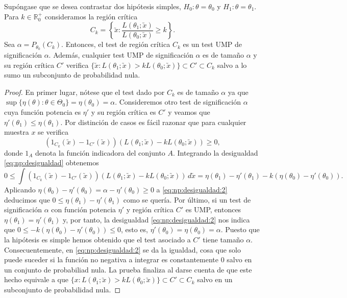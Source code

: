         \begin{thm} \label{thm:np:1}
            Supóngase que se desea contrastar dos hipótesis simples, $H_0 : \theta = \theta_0$ y $H_1 : \theta = \theta_1$. Para $k \in \mathbb{R}^+_0$ consideramos la región crítica
            \[C_k = \left\{\utilde{x}: \frac{L(\theta_1;\utilde{x})}{L(\theta_0;\utilde{x})} \ge k\right\}.\]
            Sea $\alpha = P_{\theta_0}(C_k)$. Entonces, el test de región crítica $C_k$ es un test UMP de significación $\alpha$. Además, cualquier test UMP de significación $\alpha$ es de tamaño $\alpha$ y su región crítica $C'$ verifica $\{\utilde{x}: L(\theta_1;\utilde{x}) > k L(\theta_0;\utilde{x})\} \subset C' \subset C_k$ salvo a lo sumo un subconjunto de probabilidad nula.
        \end{thm}
        \begin{proof}
            En primer lugar, nótese que el test dado por $C_k$ es de tamaño $\alpha$ ya que $\sup\{ \eta(\theta) : \theta \in \Theta_0\} = \eta(\theta_0) = \alpha$. Consideremos otro test de significación $\alpha$ cuya función potencia es $\eta'$ y su región crítica es $C'$ y veamos que $\eta'(\theta_1) \le \eta(\theta_1)$. Por distinción de casos es fácil razonar que para cualquier muestra $x$ se verifica
            \begin{equation} \label{eq:np:desigualdad}
                (1_{C_k}(\utilde{x})-1_{C'}(\utilde{x})) (L(\theta_1; \utilde{x}) - k L(\theta_0; \utilde{x})) \ge 0,
            \end{equation}
            donde $1_A$ denota la función indicadora del conjunto $A$. Integrando la desigualdad \eqref{eq:np:desigualdad} obtenemos
            \begin{equation} \label{eq:np:desigualdad:2}
                0 \le \int(1_{C_k}(\utilde{x})-1_{C'}(\utilde{x})) (L(\theta_1; \utilde{x}) - k L(\theta_0; \utilde{x})) \, d\utilde{x} = \eta(\theta_1) - \eta'(\theta_1) - k (\eta(\theta_0) - \eta'(\theta_0)).
            \end{equation}
            Aplicando $\eta(\theta_0) - \eta'(\theta_0) = \alpha  - \eta'(\theta_0) \ge 0$ a \eqref{eq:np:desigualdad:2} deducimos que $0 \le \eta(\theta_1) - \eta'(\theta_1)$ como se quería. Por último, si un test de significación $\alpha$ con función potencia $\eta'$ y región crítica $C'$ es UMP, entonces $\eta(\theta_1) = \eta'(\theta_1)$ y, por tanto, la desigualdad \eqref{eq:np:desigualdad:2} nos indica que $0 \le -k(\eta(\theta_0) - \eta'(\theta_0)) \le 0$, esto es, $\eta'(\theta_0) = \eta(\theta_0) = \alpha$. Puesto que la hipótesis es simple hemos obtenido que el test asociado a $C'$ tiene tamaño $\alpha$. Consecuentemente, en \eqref{eq:np:desigualdad:2} se da la igualdad, cosa que solo puede suceder si la función no negativa a integrar es constantemente 0 salvo en un conjunto de probabiliad nula. La prueba finaliza al darse cuenta de que este hecho equivale a que $\{x: L(\theta_1;\utilde{x}) > k L(\theta_0;\utilde{x})\} \subset C' \subset C_k$ salvo en un subconjunto de probabilidad nula.
        \end{proof}


